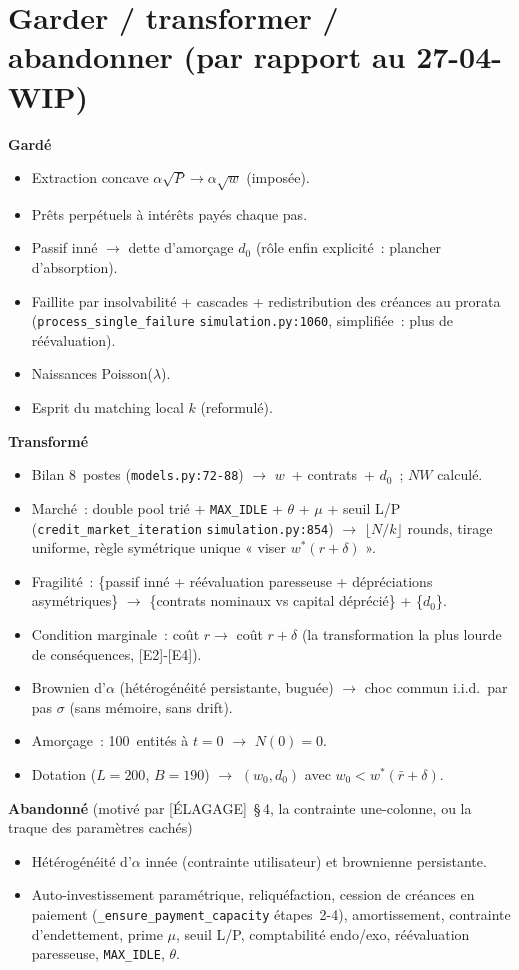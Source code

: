 \documentclass[11pt,a4paper]{article}
\newcommand{\NW}{\mathit{NW}}
\begin{document}
\section{Garder / transformer / abandonner (par rapport au 27-04-WIP)}
\label{sec:garder-transformer}

\textbf{Gardé}
\begin{itemize}
  \item Extraction concave $\alpha\sqrt{P}\to\alpha\sqrt{w}$ (imposée).
  \item Prêts perpétuels à intérêts payés chaque pas.
  \item Passif inné $\to$ dette d'amorçage $d_0$ (rôle enfin explicité~: plancher d'absorption).
  \item Faillite par insolvabilité + cascades + redistribution des créances au prorata (\texttt{process_single_failure} \texttt{simulation.py:1060}, simplifiée~: plus de réévaluation).
  \item Naissances Poisson($\lambda$).
  \item Esprit du matching local $k$ (reformulé).
\end{itemize}

\textbf{Transformé}
\begin{itemize}
  \item Bilan 8~postes (\texttt{models.py:72-88}) $\to$ $w$~+ contrats~+ $d_0$~; $\NW$ calculé.
  \item Marché~: double pool trié + \texttt{MAX_IDLE} + $\theta$ + $\mu$ + seuil L/P (\texttt{credit_market_iteration} \texttt{simulation.py:854}) $\to$ $\lfloor N/k \rfloor$ rounds, tirage uniforme, règle symétrique unique « viser $w^*(r+\delta)$ ».
  \item Fragilité~: \{passif inné + réévaluation paresseuse + dépréciations asymétriques\} $\to$ \{contrats nominaux vs capital déprécié\} + \{$d_0$\}.
  \item Condition marginale~: coût $r \to$ coût $r+\delta$ (la transformation la plus lourde de conséquences, [E2]-[E4]).
  \item Brownien d'$\alpha$ (hétérogénéité persistante, buguée) $\to$ choc commun i.i.d.\ par pas $\sigma$ (sans mémoire, sans drift).
  \item Amorçage~: 100~entités à $t=0$ $\to$ $N(0)=0$.
  \item Dotation ($L=200$, $B=190$) $\to$ $(w_0,d_0)$ avec $w_0<w^*(\bar r+\delta)$.
\end{itemize}

\textbf{Abandonné} (motivé par [ÉLAGAGE]~\S\,4, la contrainte une-colonne, ou la traque des paramètres cachés)
\begin{itemize}
  \item Hétérogénéité d'$\alpha$ innée (contrainte utilisateur) et brownienne persistante.
  \item Auto-investissement paramétrique, reliquéfaction, cession de créances en paiement (\texttt{_ensure_payment_capacity} étapes~2-4), amortissement, contrainte d'endettement, prime $\mu$, seuil L/P, comptabilité endo/exo, réévaluation paresseuse, \texttt{MAX_IDLE}, $\theta$.
\end{itemize}
\end{document}
